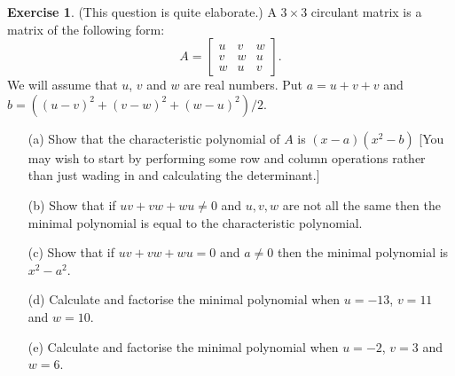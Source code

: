 \documentclass{amsart}
\newcommand{\bbm}       {\left[\begin{matrix}}
\newcommand{\ebm}       {\end{matrix}\right]}
\newcommand{\tm}        {\times}
\newcommand{\ip}[1]     {\langle #1\rangle}
\renewcommand{\:}{\colon}
\theoremstyle{definition}
\newtheorem{exercise}{Exercise}[section]
\begin{document}
\begin{exercise}
 (This question is quite elaborate.)
 A $3\tm 3$ circulant matrix is a matrix of the following form:
 \[ A = \bbm u & v & w \\ v & w & u \\ w & u & v \ebm. \]
 We will assume that $u$, $v$ and $w$ are real numbers.  Put $a=u+v+v$
 and $b=((u-v)^2+(v-w)^2+(w-u)^2)/2$.
 \begin{itemize}
  \item[(a)] Show that the characteristic polynomial of $A$ is
   $(x-a)(x^2-b)$ [You may wish to start by performing some row and
   column operations rather than just wading in and calculating the
   determinant.]
  \item[(b)] Show that if $uv+vw+wu\neq 0$ and $u,v,w$ are not all the
   same then the minimal polynomial is equal to the characteristic
   polynomial. 
  \item[(c)] Show that if $uv+vw+wu=0$ and $a\neq 0$ then the minimal
   polynomial is $x^2-a^2$.
  \item[(d)] Calculate and factorise the minimal polynomial when
   $u=-13$, $v=11$ and $w=10$.
  \item[(e)] Calculate and factorise the minimal polynomial when
   $u=-2$, $v=3$ and $w=6$.
 \end{itemize}
\end{exercise}
\end{document}
